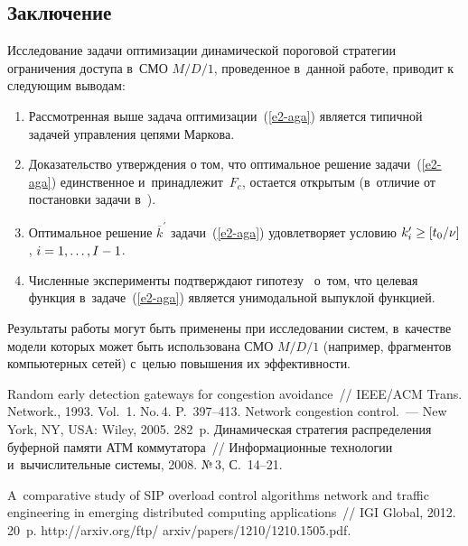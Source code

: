 \begin{multicols}{2}
 \vspace*{-6pt}

\section{Заключение}

  Исследование задачи оптимизации динамической пороговой стратегии
ограничения доступа в~СМО $M/D/1$, проведенное в~данной работе, приводит
к следующим выводам:
  \begin{enumerate}[1.]
\item Рассмотренная выше задача оптимизации~(\ref{e2-aga}) является
типичной задачей управления цепями Маркова.
\item Доказательство утверждения о том, что оптимальное решение
задачи~(\ref{e2-aga}) единственное и~принадлежит~$F_c$, остается
открытым (в~отличие от постановки задачи в~\cite{6-aga}).\\[-13pt]
\item Оптимальное решение $\overline{k}^\prime$ задачи~(\ref{e2-aga})
удовлетворяет условию $k_i^\prime \hm\geq [t_0/\nu]$, $i\hm= 1,\ldots,
I\hm-1$.\\[-13pt]
\item Численные эксперименты подтверждают гипотезу~\cite{4-aga}
о~том, что целевая функция в~задаче~(\ref{e2-aga}) является
унимодальной выпуклой функцией.
\end{enumerate}

  Результаты работы могут быть применены при исследовании систем, в~качестве модели которых может быть использована СМО $M/D/1$ (например,
фрагментов компьютерных сетей) с~целью повышения их эффективности.

\vspace*{-12pt}

    {\small\frenchspacing
 {%
 \begin{thebibliography}{99}
 Random early detection gateways for congestion
avoidance~// IEEE/ACM Trans. Network., 1993. Vol.~1. No.\,4. P.~397--413.
 Network congestion control.~--- New York, NY, USA: Wiley,
2005. 282~p.
 Динамическая стратегия распределения
буферной памяти АТМ коммутатора~// Информационные технологии и~вычислительные системы, 2008. №\,3, С.~14--21.

 A~comparative study of SIP overload control
algorithms network and traffic engineering in emerging distributed computing
applications~// IGI Global, 2012. 20~p. {\sf
http://arxiv.org/ftp/ arxiv/papers/1210/1210.1505.pdf}.


\end{thebibliography}}}
\end{multicols}
